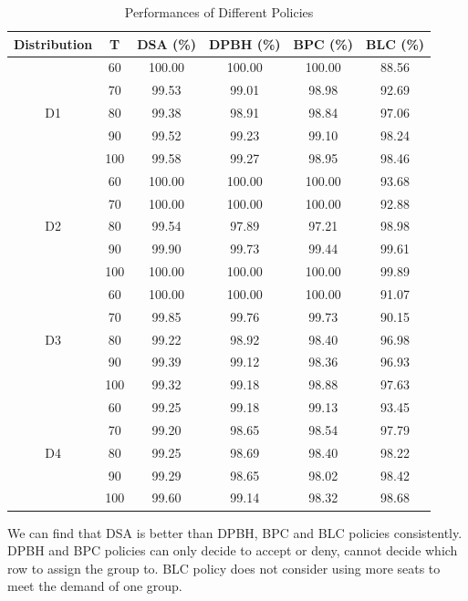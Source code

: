 \begin{table}[h]
  \centering
  \caption{Performances of Different Policies}
  \begin{tabular}{cc|cccc}
  \hline
  Distribution & T & DSA (\%) & DPBH (\%) & BPC (\%) & BLC (\%) \\
  \hline
  \multirow{5}{*}{D1} & 60 & 100.00 & 100.00 & 100.00 & 88.56 \\
  & 70    & 99.53 & 99.01 & 98.98 & 92.69  \\
  & 80    & 99.38 & 98.91 & 98.84 & 97.06  \\
  & 90    & 99.52 & 99.23 & 99.10 & 98.24  \\
  & 100   & 99.58 & 99.27 & 98.95 & 98.46 \\
  \hline
  \multirow{5}{*}{D2} & 60  & 100.00 & 100.00 & 100.00 & 93.68  \\
     & 70  & 100.00 & 100.00 & 100.00 & 92.88  \\
     & 80  & 99.54 & 97.89 & 97.21 & 98.98  \\
     & 90  & 99.90 & 99.73 & 99.44 & 99.61  \\
     & 100 & 100.00 & 100.00 & 100.00 & 99.89  \\ 
  \hline
  \multirow{5}{*}{D3} & 60  & 100.00 & 100.00 & 100.00 & 91.07  \\
  & 70  & 99.85 & 99.76 & 99.73 & 90.15 \\
  & 80  & 99.22 & 98.92 & 98.40 & 96.98  \\
  & 90  & 99.39 & 99.12 & 98.36 & 96.93  \\
  & 100  & 99.32 & 99.18 & 98.88 & 97.63  \\
    \hline
    \multirow{5}{*}{D4} & 60  & 99.25 & 99.18 & 99.13 & 93.45  \\
     & 70  & 99.20 & 98.65 & 98.54 & 97.79  \\
     & 80  & 99.25 & 98.69 & 98.40 & 98.22 \\
     & 90  & 99.29 & 98.65 & 98.02 & 98.42  \\
     & 100 & 99.60 & 99.14 & 98.32 & 98.68 \\
  \hline
  \end{tabular}
\end{table}

We can find that DSA is better than DPBH, BPC and BLC policies consistently. DPBH and BPC policies can only decide to accept or deny, cannot decide which row to assign the group to. BLC policy does not consider using more seats to meet the demand of one group.

